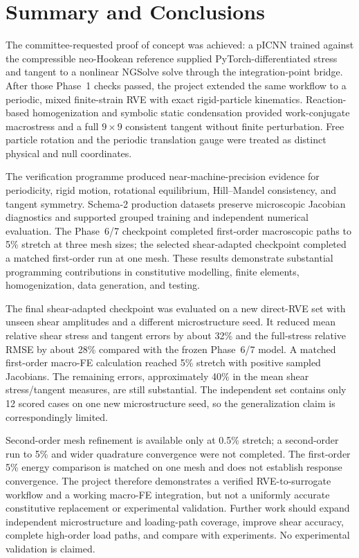 \chapter{Summary and Conclusions}
\label{ch:conclusion}

The committee-requested proof of concept was achieved: a pICNN trained against
the compressible neo-Hookean reference supplied PyTorch-differentiated stress
and tangent to a nonlinear NGSolve solve through the integration-point bridge.
After those Phase~1 checks passed, the project extended the same workflow to a
periodic, mixed finite-strain RVE with exact rigid-particle kinematics.
Reaction-based homogenization and symbolic static condensation provided
work-conjugate macrostress and a full \(9\times9\) consistent tangent without
finite perturbation. Free particle rotation and the periodic translation gauge
were treated as distinct physical and null coordinates.

The verification programme produced near-machine-precision evidence for
periodicity, rigid motion, rotational equilibrium, Hill--Mandel consistency,
and tangent symmetry. Schema-2 production datasets preserve microscopic
Jacobian diagnostics and supported grouped training and independent numerical
evaluation. The Phase~6/7 checkpoint completed first-order macroscopic paths to
5\% stretch at three mesh sizes; the selected shear-adapted
checkpoint completed a matched first-order run at one mesh. These results
demonstrate substantial programming contributions in constitutive
modelling, finite elements, homogenization, data generation, and testing.

The final shear-adapted checkpoint was evaluated on a new direct-RVE set with
unseen shear amplitudes and a different microstructure seed. It reduced mean
relative shear stress and tangent errors by about 32\% and the full-stress
relative RMSE by about 28\% compared with the frozen Phase~6/7 model. A matched
first-order macro-FE calculation reached 5\% stretch with positive sampled
Jacobians. The remaining errors, approximately 40\% in the mean shear
stress/tangent measures, are still substantial. The independent set contains
only 12 scored cases on one new microstructure seed, so the generalization
claim is correspondingly limited.

Second-order mesh refinement is available only at 0.5\% stretch; a second-order
run to 5\% and wider quadrature convergence were not completed. The first-order
5\% energy comparison is matched on one mesh and does not establish response
convergence. The project therefore demonstrates a verified RVE-to-surrogate
workflow and a working macro-FE integration, but not a uniformly accurate
constitutive replacement or experimental validation. Further work should
expand independent microstructure and loading-path coverage, improve shear
accuracy, complete high-order load paths, and compare with experiments. No
experimental validation is claimed.
